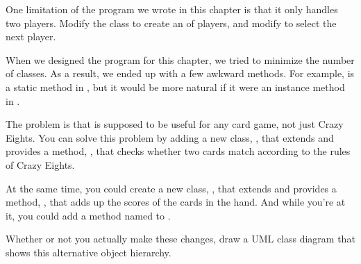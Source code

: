 \begin{exercise}  %

One limitation of the program we wrote in this chapter is that it only handles two players.
Modify the  class to create an  of players, and modify  to select the next player.

\end{exercise}


\begin{exercise}  %

When we designed the program for this chapter, we tried to minimize the number of classes.
As a result, we ended up with a few awkward methods.
For example,  is a static method in , but it would be more natural if it were an instance method in .

The problem is that  is supposed to be useful for any card game, not just Crazy Eights.
You can solve this problem by adding a new class, , that extends  and provides a method, , that checks whether two cards match according to the rules of Crazy Eights.

At the same time, you could create a new class, , that extends  and provides a method, , that adds up the scores of the cards in the hand.
And while you're at it, you could add a method named  to .

Whether or not you actually make these changes, draw a UML class diagram that shows this alternative object hierarchy.

\end{exercise}
